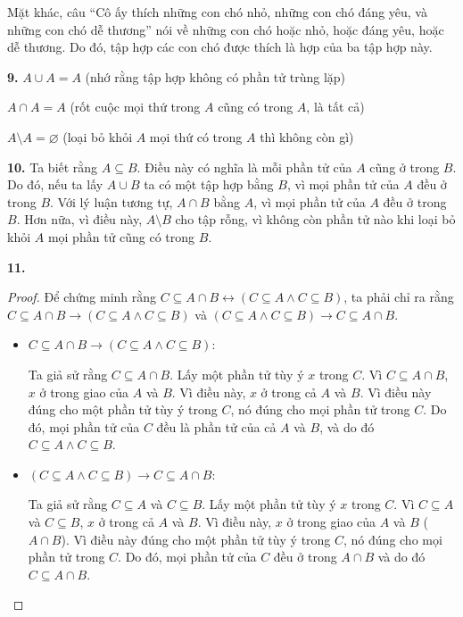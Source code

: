 \documentclass[12pt,a4paper]{article}
\theoremstyle{definition}
\begin{document}
Mặt khác, câu ``Cô ấy thích những con chó nhỏ, những con chó đáng yêu, và những con chó dễ thương'' nói về những con chó hoặc nhỏ, hoặc đáng yêu, hoặc dễ thương. Do đó, tập hợp các con chó được thích là hợp của ba tập hợp này.

\bigskip
\textbf{9.} $A \cup A = A$ (nhớ rằng tập hợp không có phần tử trùng lặp)

$A \cap A = A$ (rốt cuộc mọi thứ trong $A$ cũng có trong $A$, là tất cả)

$A \setminus A = \varnothing$ (loại bỏ khỏi $A$ mọi thứ có trong $A$ thì không còn gì)

\bigskip
\textbf{10.} Ta biết rằng $A \subseteq B$. Điều này có nghĩa là mỗi phần tử của $A$ cũng ở trong $B$. Do đó, nếu ta lấy $A \cup B$ ta có một tập hợp bằng $B$, vì mọi phần tử của $A$ đều ở trong $B$. Với lý luận tương tự, $A \cap B$ bằng $A$, vì mọi phần tử của $A$ đều ở trong $B$. Hơn nữa, vì điều này, $A \setminus B$ cho tập rỗng, vì không còn phần tử nào khi loại bỏ khỏi $A$ mọi phần tử cũng có trong $B$.

\bigskip
\textbf{11.}

\begin{proof}
Để chứng minh rằng $C \subseteq A \cap B \leftrightarrow (C \subseteq A \land C \subseteq B)$, ta phải chỉ ra rằng $C \subseteq A \cap B \to (C \subseteq A \land C \subseteq B)$ và $(C \subseteq A \land C \subseteq B) \to C \subseteq A \cap B$.

\begin{itemize}
\item $C \subseteq A \cap B \to (C \subseteq A \land C \subseteq B)$:

Ta giả sử rằng $C \subseteq A \cap B$. Lấy một phần tử tùy ý $x$ trong $C$. Vì $C \subseteq A \cap B$, $x$ ở trong giao của $A$ và $B$. Vì điều này, $x$ ở trong cả $A$ và $B$. Vì điều này đúng cho một phần tử tùy ý trong $C$, nó đúng cho mọi phần tử trong $C$. Do đó, mọi phần tử của $C$ đều là phần tử của cả $A$ và $B$, và do đó $C \subseteq A \land C \subseteq B$.

\item $(C \subseteq A \land C \subseteq B) \to C \subseteq A \cap B$:

Ta giả sử rằng $C \subseteq A$ và $C \subseteq B$. Lấy một phần tử tùy ý $x$ trong $C$. Vì $C \subseteq A$ và $C \subseteq B$, $x$ ở trong cả $A$ và $B$. Vì điều này, $x$ ở trong giao của $A$ và $B$ ($A \cap B$). Vì điều này đúng cho một phần tử tùy ý trong $C$, nó đúng cho mọi phần tử trong $C$. Do đó, mọi phần tử của $C$ đều ở trong $A \cap B$ và do đó $C \subseteq A \cap B$.
\end{itemize}
\end{proof}
\end{document}

